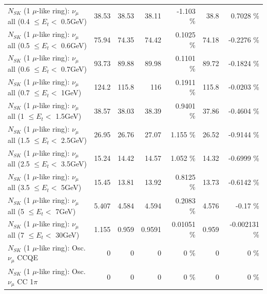 \begin{table}
\begin{tabular}{| l | r | r | r  r | r  r |}
       $N_{SK}$ (1 $\mu$-like ring): $\nu_{\mu}$ all (0.4 $\leq E_{t} <$ 0.5GeV) &           38.53 &           38.53 &           38.11 &   -1.103 \%  &            38.8 &   0.7028 \%  \\ 
       $N_{SK}$ (1 $\mu$-like ring): $\nu_{\mu}$ all (0.5 $\leq E_{t} <$ 0.6GeV) &           75.94 &           74.35 &           74.42 &   0.1025 \%  &           74.18 &  -0.2276 \%  \\ 
       $N_{SK}$ (1 $\mu$-like ring): $\nu_{\mu}$ all (0.6 $\leq E_{t} <$ 0.7GeV) &           93.73 &           89.88 &           89.98 &   0.1101 \%  &           89.72 &  -0.1824 \%  \\ 
         $N_{SK}$ (1 $\mu$-like ring): $\nu_{\mu}$ all (0.7 $\leq E_{t} <$ 1GeV) &           124.2 &           115.8 &             116 &   0.1911 \%  &           115.8 &  -0.0203 \%  \\ 
         $N_{SK}$ (1 $\mu$-like ring): $\nu_{\mu}$ all (1 $\leq E_{t} <$ 1.5GeV) &           38.57 &           38.03 &           38.39 &   0.9401 \%  &           37.86 &  -0.4604 \%  \\ 
       $N_{SK}$ (1 $\mu$-like ring): $\nu_{\mu}$ all (1.5 $\leq E_{t} <$ 2.5GeV) &           26.95 &           26.76 &           27.07 &    1.155 \%  &           26.52 &  -0.9144 \%  \\ 
       $N_{SK}$ (1 $\mu$-like ring): $\nu_{\mu}$ all (2.5 $\leq E_{t} <$ 3.5GeV) &           15.24 &           14.42 &           14.57 &    1.052 \%  &           14.32 &  -0.6999 \%  \\ 
         $N_{SK}$ (1 $\mu$-like ring): $\nu_{\mu}$ all (3.5 $\leq E_{t} <$ 5GeV) &           15.45 &           13.81 &           13.92 &   0.8125 \%  &           13.73 &  -0.6142 \%  \\ 
           $N_{SK}$ (1 $\mu$-like ring): $\nu_{\mu}$ all (5 $\leq E_{t} <$ 7GeV) &           5.407 &           4.584 &           4.594 &   0.2083 \%  &           4.576 &    -0.17 \%  \\ 
          $N_{SK}$ (1 $\mu$-like ring): $\nu_{\mu}$ all (7 $\leq E_{t} <$ 30GeV) &           1.155 &           0.959 &          0.9591 &  0.01051 \%  &           0.959 & -0.002131 \%  \\ 
\hline
\hline
                               $N_{SK}$ (1 $\mu$-like ring): Osc. $\nu_\mu$ CCQE &               0 &               0 &               0 &        0 \%  &               0 &        0 \%  \\ 
                          $N_{SK}$ (1 $\mu$-like ring): Osc. $\nu_\mu$ CC 1$\pi$ &               0 &               0 &               0 &        0 \%  &               0 &        0 \%  \\ 

\end{tabular}
\end{table}

